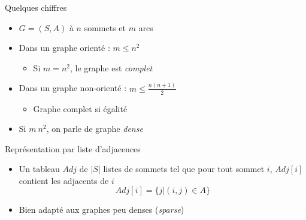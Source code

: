 \begin{frame}{Quelques chiffres}
    \begin{itemize}
        \item $G=(S,A)$ à $n$ sommets et $m$ arcs 
        \item Dans un graphe orienté : $m \leq n^2$ 
        \begin{itemize}
            \item Si $m=n^2$, le graphe est \emph{complet}
        \end{itemize}
        \item Dans un graphe non-orienté : $m \leq \frac{n(n+1)}{2}$
        \begin{itemize}
            \item Graphe complet si égalité 
        \end{itemize}
        \item Si $m ~ n^2$, on parle de graphe \emph{dense}
    \end{itemize}
\end{frame}

\begin{frame}{Représentation par liste d'adjacences}
    \begin{itemize}
        \item Un tableau $Adj$ de $|S|$ listes de sommets tel que pour tout sommet $i$, $Adj[i]$ contient les adjacents de $i$
        \begin{equation*}
            Adj[i] = \{  j | (i,j) \in A \}
        \end{equation*}
        \item Bien adapté aux graphes peu denses (\textit{sparse})
    \end{itemize}
\end{frame}

